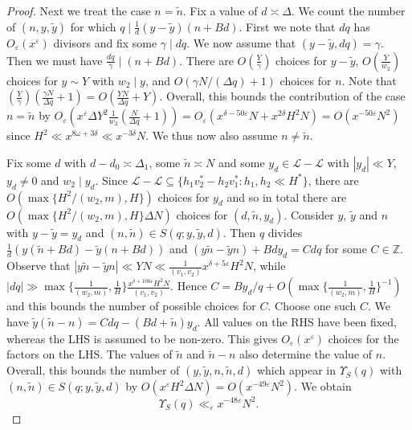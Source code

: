 \documentclass{amsart}
\numberwithin{equation}{section}
\begin{document}
\begin{proof}
\vspace{3mm} Next we treat the case $n = \widetilde{n}$.  Fix a value of $d \asymp \Delta$. We count the number of  $(n, y,\widetilde{y})$ for which $q \mid \frac{1}{d}(y-\widetilde{y})(n+Bd)$. First we note that $dq$ has $O_\varepsilon(x^\varepsilon)$ divisors and fix some $\gamma \mid dq$. We now assume that $(y-\widetilde{y},dq)=\gamma$.  Then we must have $\frac{dq}{\gamma} \mid (n+Bd)$. There are $O(\frac{Y}{\gamma})$ choices for $y-\widetilde{y}$, $O(\frac{Y}{w_2})$ choices for $y \sim Y$ with $w_2 \mid y$, and $O(\gamma N/(\Delta q)+1)$ choices for $n$. Note that $(\frac{Y}{\gamma})(\frac{\gamma N}{\Delta q}+1) = O(\frac{YN}{\Delta q} + Y )$. Overall, this bounds the contribution of the case $n = \widetilde{n}$ by $O_\varepsilon(x^{\varepsilon} \Delta Y^2 \frac{1}{w_2} (\frac{ N }{\Delta q} +1)) = O_\varepsilon(x^{\delta-50\varepsilon}   N  +x^{2\delta} H^2 N) = O(x^{-50\varepsilon} N^2)$  since $H^2 \ll x^{8\omega+3\delta} \ll x^{-3\delta}N$.  We thus now also assume $n \neq \widetilde{n}$.  


\vspace{3mm} Fix some $d$ with $d-d_0 \asymp \Delta_1$, some $\widetilde{n} \asymp N$ and some $y_d \in \mathcal{L}-\mathcal{L}$ with $|y_d| \ll Y$, $y_d \neq 0$  and $w_2 \mid y_d$. Since $\mathcal{L}-\mathcal{L} \subseteq \{h_1 v_2^*-h_2 v_1^*: h_1, h_2 \ll H^*\}$, there are $O(\max\{H^2/(w_2,m),H\})$ choices for $y_d$ and so in total there are $O(\max\{H^2/(w_2,m),H\} \Delta N )$ choices for $(d,\widetilde{n},y_d)$. Consider $y$, $\widetilde{y}$ and  $n$ with $y-\widetilde{y}=y_d$ and $(n,\widetilde{n}) \in S(q;y,\widetilde{y},d)$.  Then $q$ divides $\frac{1}{d}(y(\widetilde{n}+B d)-  \widetilde{y}(n+B d))$ and $(y\widetilde{n}-\widetilde{y}n)+B d y_d = Cdq$ for some $C \in \mathbb{Z}$.  Observe that  $|y\widetilde{n}-\widetilde{y}n| \ll  Y N \ll \frac{1}{(v_1,v_2)}x^{\delta+5\varepsilon}H^2 N $, while $|dq| \gg  \max\{\frac{1}{(w_2,m)}, \frac{1}{H}\}\frac{x^{\delta+100\varepsilon}  H^2 N}{(v_1,v_2)}$.  Hence $C = By_d/q+ O\left(  \max\{\frac{1}{(w_2,m)}, \frac{1}{H}\}^{-1}\right)$ and this bounds the number of possible choices for $C$. Choose one such $C$. We have $ \widetilde{y}(\widetilde{n}-n) = Cdq -(Bd+\widetilde{n})y_d$. All values on the RHS have been fixed, whereas the LHS is assumed to be non-zero. This gives $O_\varepsilon(x^\varepsilon)$ choices for the factors on  the LHS.  The values of $\widetilde{n}$ and $\widetilde{n}-n$ also determine the value of $n$. Overall, this bounds the number of   $(y, \widetilde{y}, n, \widetilde{n},d)$  which appear in $\Upsilon_S(q)$ with $(n,\widetilde{n}) \in S(q;y,\widetilde{y},d)$ by 
$O(x^{\varepsilon}H^2\Delta N)= O(
 x^{-49\varepsilon}   N^2).$   We obtain $$
\Upsilon_S(q) \ll_\varepsilon x^{-48\varepsilon}   N^2. $$


\end{proof}
\end{document}

